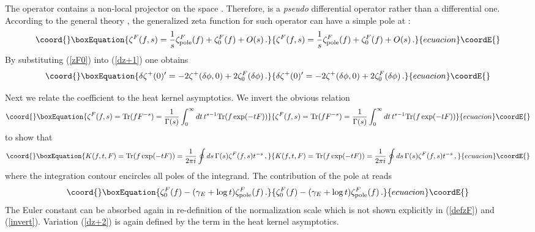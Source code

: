 \documentclass[a4paper,12pt]{article}
\begin{document}
The operator \coordHE{} contains a non-local projector on the
space \coordHE{}. Therefore, \coordHE{} is a {\it pseudo}
differential operator rather than a differential one. According to the
general theory \cite{Gilkey95}, the generalized zeta
function for such operator can have a simple pole
at \coordHE{}:
\begin{equation}\coord{}\boxEquation{
\zeta^F (f,s)=\frac 1s \zeta^F_{\mbox{\scriptsize pole}}(f)
+\zeta^F_0 (f)+O(s) \,.
\label{zF0}
}{
\zeta^F (f,s)=\frac 1s \zeta^F_{\mbox{\scriptsize pole}}(f)
+\zeta^F_0 (f)+O(s) \,.
}{ecuacion}\coordE{}\end{equation}
By substituting (\ref{zF0}) into (\ref{dz+1}) one obtains
\begin{equation}\coord{}\boxEquation{
\delta\zeta^+(0)'=-2\zeta^+ (\delta \phi ,0)
+2 \zeta^F_0 (\delta\phi ) \,. \label{dz+2}
}{
\delta\zeta^+(0)'=-2\zeta^+ (\delta \phi ,0)
+2 \zeta^F_0 (\delta\phi ) \,. }{ecuacion}\coordE{}\end{equation}

Next we relate the coefficient \coordHE{} to the heat
kernel asymptotics. We invert the obvious relation
\begin{equation}\coord{}\boxEquation{
\zeta^F (f,s)= {\rm Tr}(fF^{-s})=
\frac 1{\Gamma (s)} \int_0^\infty dt\, t^{s-1}
{\rm Tr} (f\exp (-tF))  \label{defzF}
}{
\zeta^F (f,s)= {\rm Tr}(fF^{-s})=
\frac 1{\Gamma (s)} \int_0^\infty dt\, t^{s-1}
{\rm Tr} (f\exp (-tF))  }{ecuacion}\coordE{}\end{equation}
to show that
\begin{equation}\coord{}\boxEquation{
K(f,t,F)={\rm Tr} (f\exp (-tF))
=\frac 1{2\pi i} \oint ds\, \Gamma (s)\zeta^F (f,s) t^{-s}\,,
\label{invert}
}{
K(f,t,F)={\rm Tr} (f\exp (-tF))
=\frac 1{2\pi i} \oint ds\, \Gamma (s)\zeta^F (f,s) t^{-s}\,,
}{ecuacion}\coordE{}\end{equation}
where the integration contour encircles all poles of the integrand.
The contribution of the pole at \coordHE{} reads
\begin{equation}\coord{}\boxEquation{
\zeta^F_0(f) -(\gamma_E +\log t )\zeta^F_{\mbox{\scriptsize pole}}(f)
\,. \label{polecont}
}{
\zeta^F_0(f) -(\gamma_E +\log t )\zeta^F_{\mbox{\scriptsize pole}}(f)
\,. }{ecuacion}\coordE{}\end{equation}
The Euler constant \coordHE{} can be absorbed again
in re-definition of the normalization scale \myHighlight{$\mu$}\coordHE{} which
is not shown explicitly in (\ref{defzF}) and (\ref{invert}).
Variation (\ref{dz+2}) is again defined by the \coordHE{}
term in the heat kernel asymptotics.
\end{document}
